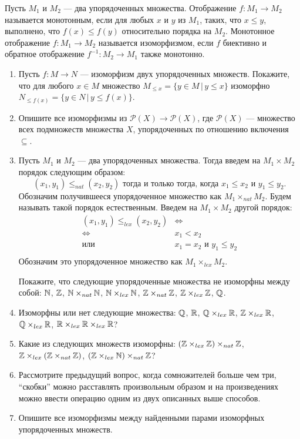 Пусть $M_1$ и $M_2$ --- два упорядоченных множества. Отображение $f\colon M_1 \to M_2$ называется монотонным, если для любых $x$ и $y$ из $M_1$, таких, что $x\leq y$, выполнено, что $f(x)\leq f(y)$ относительно порядка на $M_2$. Монотонное отображение $f\colon M_1\to M_2$ называется изоморфизмом, если $f$ биективно и обратное отображение $f^{-1}\colon M_2 \to M_1$ также монотонно.
\begin{enumerate}
\item Пусть $f\colon M \to N$ --- изоморфизм двух упорядоченных множеств. Покажите, что для любого $x\in M$ множество $M_{\leq x}=\{y\in M\,|\, y\leq x\}$  изоморфно  $N_{\leq f(x)}=\{y\in N\,|\, y\leq f(x)\}$. 
\item Опишите все изоморфизмы из $\mathcal P(X) \to \mathcal P(X)$, где $\mathcal P(X)$ --- множество всех подмножеств множества $X$, упорядоченных по отношению включения $\subseteq$.
\item Пусть $M_1$ и $M_2$ --- два упорядоченных множества. Тогда введем на $M_1\times M_2$ порядок следующим образом:
 $$(x_1, y_1)\leq_{nat} (x_2,y_2) \text{ тогда и только тогда, когда } x_1\leq x_2 \text{ и } y_1\leq y_2.$$
Обозначим получившееся упорядоченное множество как $M_1\times_{nat}M_2$. Будем называть такой порядок естественным. Введем на $M_1\times M_2$ другой порядок:
\begin{align*}
(x_1, y_1)\leq_{lex} (x_2,y_2) & \Longleftrightarrow \\
\Longleftrightarrow\ \ & x_1< x_2\\
\text{или}\ \ & x_1=x_2 \text{ и } y_1\leq y_2 \\
\end{align*}
Обозначим это упорядоченное множество как $M_1\times_{lex} M_2$.

Покажите, что следующие упорядоченные множества не изоморфны между собой: $\mathbb{N}$, $\mathbb{Z}$, $\mathbb{N}\times_{nat} \mathbb{N}$, $\mathbb{N}\times_{lex} \mathbb{N}$, $\mathbb{Z}\times_{nat} \mathbb{Z}$, $\mathbb{Z}\times_{lex} \mathbb{Z}$, $\mathbb{Q}$.
\item Изоморфны или нет следующие множества: $\mathbb{Q}$, $\mathbb{R}$, $\mathbb{Q} \times_{lex} \mathbb{R}$, $\mathbb{Z} \times_{lex} \mathbb{R}$, $\mathbb{Q} \times_{lex} \mathbb{R}$, $\mathbb{R} \times_{lex} \mathbb{R} \times_{lex} \mathbb{R}$?
\item Какие из следующих множеств изоморфны: $(\mathbb{Z}\times_{lex} \mathbb{Z})\times_{nat} \mathbb{Z}$, $\mathbb{Z}\times_{lex} (\mathbb{Z}\times_{nat} \mathbb{Z})$, $(\mathbb{Z}\times_{lex} \mathbb{N})\times_{nat} \mathbb{Z}$?
\item Рассмотрите предыдущий вопрос, когда сомножителей больше чем три, ``скобки''  можно расставлять произвольным образом и на произведениях можно ввести операцию одним из двух описанных выше способов.
\item Опишите все изоморфизмы между найденными парами изоморфных упорядоченных множеств.
\end{enumerate}


